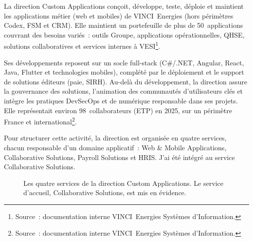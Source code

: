 La direction Custom Applications conçoit, développe, teste, déploie et
maintient les applications métier (web et mobiles) de VINCI~Energies
(hors périmètres Codex, FSM et CRM). Elle maintient un portefeuille de plus
de 50~applications couvrant des besoins variés~: outils Groupe, applications
opérationnelles, QHSE, solutions collaboratives et services internes à
VESI\footnote{Source~: documentation interne VINCI~Energies Systèmes
d'Information.}.

Ses développements reposent sur un socle full-stack (C\#/.NET, Angular,
React, Java, Flutter et technologies mobiles), complété par le déploiement
et le support de solutions éditeurs (paie, SIRH). Au-delà du développement,
la direction assure la gouvernance des solutions, l'animation des communautés
d'utilisateurs clés et intègre les pratiques DevSecOps et de
numérique responsable dans ses projets. Elle représentait environ
98~collaborateurs (ETP) en 2025, sur un périmètre France et
international\footnote{Source~: documentation interne VINCI~Energies Systèmes
d'Information.}.

Pour structurer cette activité, la direction est organisée en quatre services,
chacun responsable d'un domaine applicatif~: Web \& Mobile
Applications, Collaborative Solutions, Payroll Solutions
et HRIS. J'ai été intégré au service Collaborative Solutions.

\begin{figure}[H]
  \centering
  \caption{Les quatre services de la direction Custom Applications. Le service
    d'accueil, Collaborative Solutions, est mis en évidence.}
  \label{fig:custom-apps}
\end{figure}

